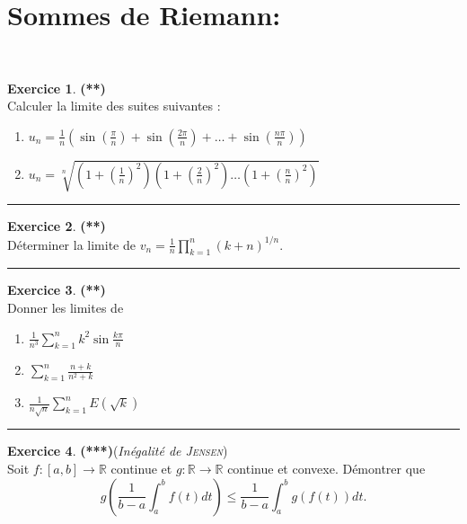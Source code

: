 \documentclass[a4paper,11pt]{article}
\theoremstyle{definition}
\newtheorem{exo}{Exercice} %
\begin{document}
\section*{Sommes de Riemann:}\hfill\\%


\begin{minipage}{1\linewidth}\begin{minipage}[t]{0.48\linewidth}\raggedright
	
\begin{exo}\textbf{(**)}\quad\\[0.2cm]
Calculer la limite des suites suivantes :
\begin{enumerate}
\item $\displaystyle u_n=\frac 1n\left(\sin\left(\frac{\pi}{n}\right)+\sin\left(\frac{2\pi}{n}\right)+\dots+\sin\left(\frac{n\pi}{n}\right)\right)$
\item $\displaystyle  u_n=\sqrt[n]{\left(1+\left(\frac{1}{n}\right)^2\right)\left(1+\left(\frac{2}{n}\right)^2\right)\dots\left(1+\left(\frac{n}{n}\right)^2\right)}$
\end{enumerate}		

\centering\rule{1\linewidth}{0.6pt}\end{exo}



\begin{exo}\textbf{(**)}\quad\\[0.2cm]
Déterminer la limite de \quad  $\displaystyle v_n=\frac1n\prod_{k=1}^n (k+n)^{1/n}.$

\centering\rule{1\linewidth}{0.6pt}\end{exo}

\begin{exo}\textbf{(**)}\quad\\[0.2cm]
Donner les limites de 
\begin{multicols}{2}
\begin{enumerate}
	\item $\displaystyle \frac{1}{n^3}\sum_{k=1}^{n}k^2\sin\frac{k\pi}{n}$
	\item $\displaystyle \sum_{k=1}^{n}\frac{n+k}{n^2+k}$
	\item $ \displaystyle \frac{1}{n\sqrt{n}}\sum_{k=1}^{n}E(\sqrt{k})$
\end{enumerate}
\end{multicols}

	
\centering\rule{1\linewidth}{0.6pt}\end{exo}


\begin{exo}\textbf{(***)}\quad(\textit{Inégalité de \textsc{Jensen}})\\[0.2cm]
Soit $f:[a,b]\to\mathbb R$ continue et $g:\mathbb R\to\mathbb R$ continue et convexe. Démontrer que 
$$g\left(\frac{1}{b-a}\int_a^b f(t)dt \right)\leq \frac{1}{b-a}\int_a^b g(f(t))dt.$$


\end{exo}
\end{minipage}
\end{minipage}
\end{document}
